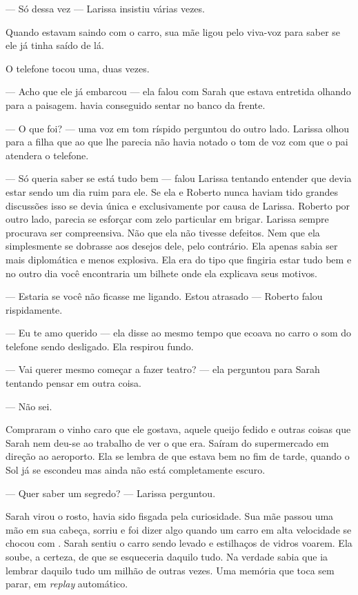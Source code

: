 --- Só dessa vez --- Larissa insistiu várias vezes.

Quando estavam saindo com o carro, sua mãe ligou pelo viva-voz para saber se ele já tinha saído de lá.

O telefone tocou uma, duas vezes.

--- Acho que ele já embarcou --- ela falou com Sarah\mudanca{,} que estava entretida olhando para a paisagem.  havia conseguido sentar no banco da frente.

--- O que foi? --- uma voz em tom ríspido perguntou do outro lado. Larissa olhou para a filha que ao que lhe parecia não havia notado o tom de voz com que o pai atendera o telefone.

--- Só queria saber se está tudo bem --- falou Larissa\mudanca{,} tentando entender que devia estar sendo um dia ruim para ele. Se ela e Roberto nunca haviam tido grandes discussões\mudanca{,} isso se devia única e exclusivamente por causa de Larissa. Roberto\mudanca{,} por outro lado, parecia se esforçar com zelo particular em brigar. Larissa sempre procurava ser compreensiva. Não que ela não tivesse defeitos. Nem que ela simplesmente se dobrasse aos desejos dele, pelo contrário. Ela apenas sabia ser mais diplomática e menos explosiva. Ela era do tipo que fingiria estar tudo bem e no outro dia você encontraria um bilhete onde ela explicava seus motivos.

--- Estaria se você não ficasse me ligando. Estou atrasado --- Roberto falou rispidamente.

--- Eu te amo querido --- ela disse\mudanca{,} ao mesmo tempo que ecoava no carro o som do telefone sendo desligado. Ela respirou fundo.

--- Vai querer mesmo começar a fazer teatro? --- ela perguntou para Sarah\mudanca{,} tentando pensar em outra coisa.

--- Não sei.

Compraram o vinho caro que ele gostava, aquele queijo fedido e outras coisas que Sarah nem deu-se ao trabalho de ver o que era. Saíram do supermercado em direção ao aeroporto. Ela se lembra de que estava bem no fim de tarde, quando o Sol já se escondeu\mudanca{,} mas ainda não está completamente escuro.

--- Quer saber um segredo? --- Larissa perguntou.

Sarah virou o rosto, havia sido fisgada pela curiosidade. Sua mãe passou uma mão em sua cabeça, sorriu e foi dizer algo\mudanca{,} quando um carro em alta velocidade se chocou com . Sarah sentiu o carro sendo levado e estilhaços de vidros voarem. Ela soube,  a certeza, de que  se esqueceria daquilo tudo. Na verdade\mudanca{,} sabia que ia lembrar daquilo tudo um milhão de outras vezes. Uma memória que toca sem parar, em \emph{replay} automático.

